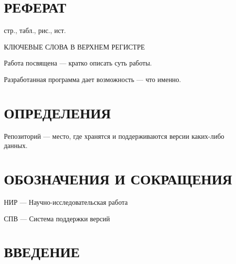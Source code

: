 \documentclass[a4paper,12pt]{article}
\newcounter{mycitecount}                                %
\begin{document}
\pagebreak

\vfill


\pagebreak

\thispagestyle{empty}

\section*{\centering РЕФЕРАТ}

 стр.,  табл.,  рис., \totalmycitecounts ист. 

КЛЮЧЕВЫЕ СЛОВА В ВЕРХНЕМ РЕГИСТРЕ

Работа посвящена --- кратко описать суть работы.

Разработанная программа дает возможность --- что именно.

\pagebreak
\thispagestyle{empty}

\section*{\centering ОПРЕДЕЛЕНИЯ}

Репозиторий --- место, где хранятся и поддерживаются версии каких-либо данных. 

\pagebreak

\section*{\centering ОБОЗНАЧЕНИЯ И СОКРАЩЕНИЯ}


НИР --- Научно-исследовательская работа

СПВ --- Система поддержки версий



\pagebreak



\tableofcontents

\pagebreak

\section*{\centering ВВЕДЕНИЕ}
\pagebreak

%
\pagebreak
\pagebreak
\pagebreak
\end{document}
